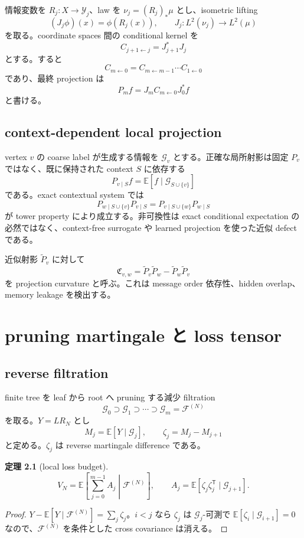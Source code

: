 \documentclass[11pt,a4paper,openany]{book}
\newtheorem{theorem}[definition]{定理}
\numberwithin{equation}{chapter}
\newcommand{\E}{\mathbb E}
\newcommand{\cF}{\mathcal F}
\newcommand{\cG}{\mathcal G}
\newcommand{\cY}{\mathcal Y}
\begin{document}
情報変数を $R_j:X\to\cY_j$、law を $\nu_j=(R_j)_*\mu$ とし、isometric lifting
\[
(J_j\phi)(x)=\phi(R_j(x)),
\qquad
J_j:L^2(\nu_j)\to L^2(\mu)
\]
を取る。coordinate spaces 間の conditional kernel を
\[
C_{j+1\leftarrow j}=J_{j+1}^*J_j
\]
とする。すると
\[
C_{m\leftarrow0}
=C_{m\leftarrow m-1}\cdots C_{1\leftarrow0}
\]
であり、最終 projection は
\[
P_mf=J_mC_{m\leftarrow0}J_0^*f
\]
と書ける。

\section{context-dependent local projection}
vertex $v$ の coarse label が生成する情報を $\cG_v$ とする。正確な局所射影は固定 $P_v$ ではなく、既に保持された context $S$ に依存する
\[
P_{v\mid S}f
=\E[f\mid\cG_{S\cup\{v\}}]
\]
である。exact contextual system では
\[
P_{w\mid S\cup\{v\}}P_{v\mid S}
=P_{v\mid S\cup\{w\}}P_{w\mid S}
\]
が tower property により成立する。非可換性は exact conditional expectation の必然ではなく、context-free surrogate や learned projection を使った近似 defect である。

近似射影 $\widetilde P_v$ に対して
\[
\mathfrak C_{v,w}
=\widetilde P_v\widetilde P_w-\widetilde P_w\widetilde P_v
\]
を projection curvature と呼ぶ。これは message order 依存性、hidden overlap、memory leakage を検出する。

\chapter{pruning martingale と loss tensor}
\section{reverse filtration}
finite tree を leaf から root へ pruning する減少 filtration
\[
\cG_0\supset\cG_1\supset\cdots\supset\cG_m=\cF^{(N)}
\]
を取る。$Y=LR_N$ とし
\[
M_j=\E[Y\mid\cG_j],
\qquad
\zeta_j=M_j-M_{j+1}
\]
と定める。$\zeta_j$ は reverse martingale difference である。

\begin{theorem}[local loss budget]
\label{thm:local-loss-budget}
\[
\boxed{
V_N
=\E\left[
\sum_{j=0}^{m-1}A_j
\middle|\cF^{(N)}
\right],
\qquad
A_j=\E[\zeta_j\zeta_j^{\mathsf T}\mid\cG_{j+1}].}
\]
\end{theorem}
\begin{proof}
$Y-\E[Y\mid\cF^{(N)}]=\sum_j\zeta_j$。$i<j$ なら $\zeta_j$ は $\cG_j$-可測で $\E[\zeta_i\mid\cG_{i+1}]=0$ なので、$\cF^{(N)}$ を条件とした cross covariance は消える。
\end{proof}
\end{document}
